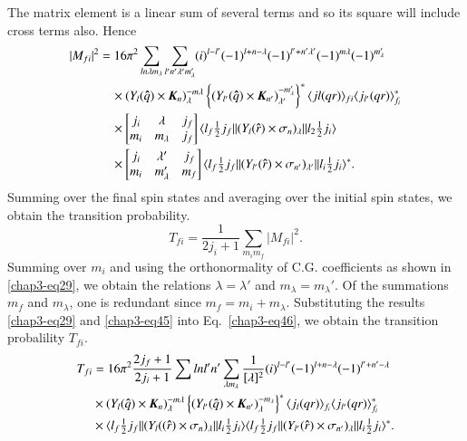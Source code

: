 The matrix element is a linear sum of several terms and so its square will include cross terms also. Hence
\begin{align}
  |M_{fi}|^2 & = 16\pi^2 \sum_{ln\lambda m_\lambda} \sum_{l' n' \lambda' m_\lambda '} (i)^{l-l'} (-1)^{l + n - \lambda} (-1)^{l' + n' \lambda'} (-1)^{m\lambda} (-1)^{m_\lambda'} \notag \\
  &  \quad \times (Y_l ({\boldsymbol \hat{q}}) \times {\boldsymbol K}_n)_\lambda^{-m\lambda}  \left\{ (Y_{l'} ({\boldsymbol \hat{q}}) \times {\boldsymbol K}_{n'})_{\lambda'}^{-m_\lambda'}\right\}^\ast \langle jl (qr)\rangle_{fi} \langle j_{l'}(qr)\rangle^\ast_{f_i} \notag \\
  & \quad \times \begin{bmatrix} j_i & \lambda & j_f\\ m_i & m_\lambda & j_f \end{bmatrix}
  \langle l_f \tfrac{1}{2} j_f || (Y_l ({\boldsymbol \hat{r}}) \times \sigma_n)_\lambda || l_2 \tfrac{1}{2} j_i \rangle \notag \\
  & \quad \times \begin{bmatrix} j_i & \lambda' & j_f\\ m_i & m_\lambda' & m_f \end{bmatrix}
  \langle l_f \tfrac{1}{2} j_f || (Y_{l'} ({\boldsymbol \hat{r}}) \times \sigma_{n'})_{\lambda'} || l_i \tfrac{1}{2} j_i \rangle^\ast. \label{chap3-eq45}
\end{align}
Summing over the final spin states and averaging over the initial spin states, we obtain the transition probability.
\begin{equation}
  T_{fi} = \frac{1}{2j_i +1} \sum_{m_i m_f} |M_{fi}|^2. \label{chap3-eq46}
\end{equation}
Summing over $m_i$ and using the orthonormality of C.G. coefficients as shown in \eqref{chap3-eq29}, we obtain the relations $\lambda = \lambda'$ and $m_\lambda= m_\lambda'$. Of the summations $m_f$ and $m_\lambda$, one is redundant since $m_f= m_i+ m_\lambda$. Substituting the results \eqref{chap3-eq29} and \eqref{chap3-eq45} into Eq.\ \eqref{chap3-eq46}, we obtain the transition probalility $T_{fi}$.
\begin{align}
  T_{fi} & = 16\pi^2 \frac{2j_f +1}{2j_i+1} \sum{lnl'n'} \sum_{\lambda m_\lambda} \frac{1}{[\lambda]^2} (i)^{l-l'} (-1)^{l+ n - \lambda} (-1)^{l' + n'-\lambda}\notag \\
  &  \times (Y_l ({\boldsymbol \hat{q}}) \times {\boldsymbol K}_n)^{-m\lambda}_\lambda \left\{ (Y_{l'}({\boldsymbol \hat{q}}) \times {\boldsymbol K}_{n'})_\lambda^{-m_\lambda}\right\}^\ast \langle j_l (qr)\rangle_{f_i} \langle j_{l'}(qr)\rangle_{f_i}^\ast \notag \\
  &  \times \langle l_f \tfrac{1}{2} j_f || (Y_l (({\boldsymbol \hat{r}}) \times \sigma_n)_\lambda || l_i \tfrac{1}{2}j_i \rangle \langle l_f \tfrac{1}{2} j_f  || (Y_{l'} ({\boldsymbol \hat{r}}) \times \sigma_{n'})_\lambda || l_i \tfrac{1}{2} j_i \rangle^\ast. \label{chap3-eq47}
\end{align}

